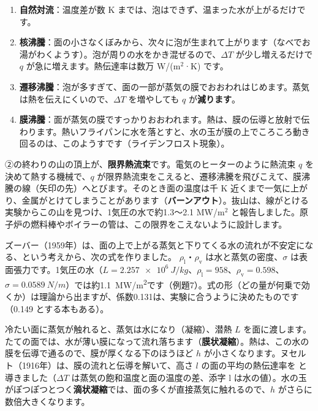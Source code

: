 \begin{enumerate}[label={\bkcircled{\arabic*}}, leftmargin=2.4\zw, itemsep=2pt, topsep=2pt]
\item \textbf{自然対流}：温度差が数 K までは、泡はできず、温まった水が上がるだけです。
\item \textbf{核沸騰}：面の小さなくぼみから、次々に泡が生まれて上がります（なべでお湯がわくようす）。泡が周りの水をかき混ぜるので、$\Delta T$ が少し増えるだけで $q$ が急に増えます。熱伝達率は数万 W/(m$^2$·K) です。
\item \textbf{遷移沸騰}：泡が多すぎて、面の一部が蒸気の膜でおおわれはじめます。蒸気は熱を伝えにくいので、$\Delta T$ を増やしても $q$ が\textbf{減ります}。
\item \textbf{膜沸騰}：面が蒸気の膜ですっかりおおわれます。熱は、膜の伝導と放射で伝わります。熱いフライパンに水を落とすと、水の玉が膜の上でころころ動き回るのは、このようすです（ライデンフロスト現象）。
\end{enumerate}
②の終わりの山の頂上が、\textbf{限界熱流束}です。電気のヒーターのように熱流束 $q$ を決めて熱する機械で、$q$ が限界熱流束をこえると、遷移沸騰を飛びこえて、膜沸騰の線（矢印の先）へとびます。そのとき面の温度は千 K 近くまで一気に上がり、金属がとけてしまうことがあります（\textbf{バーンアウト}）。抜山は、線がとける実験からこの山を見つけ、1気圧の水で約1.3〜2.1 MW/m$^2$ と報告しました。原子炉の燃料棒やボイラーの管は、この限界をこえないように設計します。

ズーバー（1959年）は、面の上で上がる蒸気と下りてくる水の流れが不安定になる、という考えから、次の式を作りました。
$\rho_{\mathrm l}$・$\rho_{\mathrm v}$ は水と蒸気の密度、$\sigma$ は表面張力です。1気圧の水（$L=\qty{2.257e6}{J/kg}$、$\rho_{\mathrm l}=958$、$\rho_{\mathrm v}=0.598$、$\sigma=\qty{0.0589}{N/m}$）では約\qty{1.1}{MW/m^2}です（例題7）。式の形（どの量が何乗で効くか）は理論から出ますが、係数0.131は、実験に合うように決めたものです（0.149 とする本もある）。

冷たい面に蒸気が触れると、蒸気は水になり（凝縮）、潜熱 $L$ を面に渡します。たての面では、水が薄い膜になって流れ落ちます（\textbf{膜状凝縮}）。熱は、この水の膜を伝導で通るので、膜が厚くなる下のほうほど $h$ が小さくなります。ヌセルト（1916年）は、膜の流れと伝導を解いて、高さ $l$ の面の平均の熱伝達率を
と導きました（$\Delta T$ は蒸気の飽和温度と面の温度の差、添字 l は水の値）。水の玉がぽつぽつとつく\textbf{滴状凝縮}では、面の多くが直接蒸気に触れるので、$h$ がさらに数倍大きくなります。

